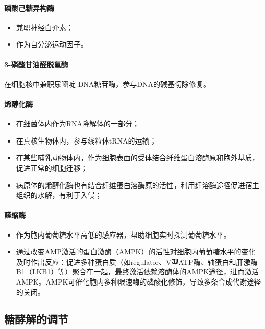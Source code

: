 \paragraph{磷酸己糖异构酶}

\begin{itemize}
	\item 兼职神经白介素；
	\item 作为自分泌运动因子。
\end{itemize}

\paragraph{3-磷酸甘油醛脱氢酶}

在细胞核中兼职尿嘧啶-DNA糖苷酶，参与DNA的碱基切除修复。

\paragraph{烯醇化酶}

\begin{itemize}
	\item 在细菌体内作为RNA降解体的一部分；
	\item 在真核生物体内，参与线粒体tRNA的运输；
	\item 在某些哺乳动物体内，作为细胞表面的受体结合纤维蛋白溶酶原和胞外基质，促进正常的细胞迁移；
	\item 病原体的烯醇化酶也有结合纤维蛋白溶酶原的活性，利用纤溶酶途径促进宿主组织的水解，有利于入侵；
\end{itemize}

\paragraph{醛缩酶}

\begin{itemize}
	\item 作为胞内葡萄糖水平高低的感应器，帮助细胞实时探测葡萄糖水平。
	\item 通过改变AMP激活的蛋白激酶（AMPK）的活性对细胞内葡萄糖水平的变化及时作出反应：促进多种蛋白质（如regulator、V型ATP酶、轴蛋白和肝激酶B1（LKB1）等）聚合在一起，最终激活依赖溶酶体的AMPK途径，进而激活AMPK。AMPK可催化胞内多种限速酶的磷酸化修饰，导致多条合成代谢途径的关闭。
\end{itemize}

\subsection{糖酵解的调节}

